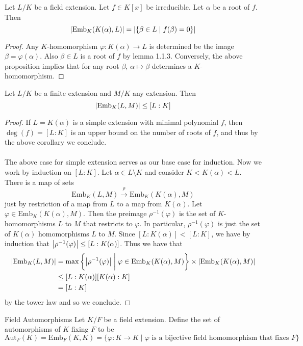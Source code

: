 \documentclass[a4paper]{article}
\begin{document}
\begin{crl}{}{} Let $L/K$ be a field extension. Let $f\in K[x]$ be irreducible. Let $\alpha$ be a root of $f$. Then $$\abs{\text{Emb}_K(K(\alpha),L)}=\abs{\{\beta\in L\;|\;f(\beta)=0\}}$$ \tcbline
\begin{proof}
Any $K$-homomorphism $\varphi:K(\alpha)\to L$ is determined be the image $\beta=\varphi(\alpha)$. Also $\beta\in L$ is a root of $f$ by lemma 1.1.3. Conversely, the above proposition implies that for any root $\beta$, $\alpha\mapsto\beta$ determines a $K$-homomorphism. 
\end{proof}
\end{crl}

\begin{thm}{}{} Let $L/K$ be a finite extension and $M/K$ any extension. Then $$\abs{\text{Emb}_K(L,M)}\leq[L:K]$$ \tcbline
\begin{proof}
If $L=K(\alpha)$ is a simple extension with minimal polynomial $f$, then $\deg(f)=[L:K]$ is an upper bound on the number of roots of $f$, and thus by the above corollary we conclude. \\~\\

The above case for simple extension serves as our base case for induction. Now we work by induction on $[L:K]$. Let $\alpha\in L\setminus K$ and consider $K<K(\alpha)<L$. There is a map of sets $$\text{Emb}_K(L,M)\overset{\rho}{\to}\text{Emb}_K(K(\alpha),M)$$ just by restriction of a map from $L$ to a map from $K(\alpha)$. Let $\varphi\in\text{Emb}_K(K(\alpha),M)$. Then the preimage $\rho^{-1}(\varphi)$ is the set of $K$-homomorphisms $L$ to $M$ that restricts to $\varphi$. In particular, $\rho^{-1}(\varphi)$ is just the set of $K(\alpha)$ homomorphisms $L$ to $M$. Since $[L:K(\alpha)]<[L:K]$, we have by induction that $\abs{\rho^{-1}(\varphi)}\leq[L:K(\alpha)]$. Thus we have that 
\begin{align*}
\abs{\text{Emb}_K(L,M)}&=\max\left\{\abs{\rho^{-1}(\varphi)}\;\bigg{|}\;\varphi\in\text{Emb}_K(K(\alpha),M)\right\}\times\abs{\text{Emb}_K(K(\alpha),M)}\\
&\leq[L:K(\alpha)][K(\alpha):K]\\
&=[L:K]
\end{align*}
by the tower law and so we conclude. 
\end{proof}
\end{thm}

\begin{defn}{Field Automorphisms}{} Let $K/F$ be a field extension. Define the set of automorphisms of $K$ fixing $F$ to be $$\text{Aut}_F(K)=\text{Emb}_F(K,K)=\{\varphi:K\to K\;|\;\varphi\text{ is a bijective field homomorphism that fixes }F\}$$
\end{defn}
\end{document}
